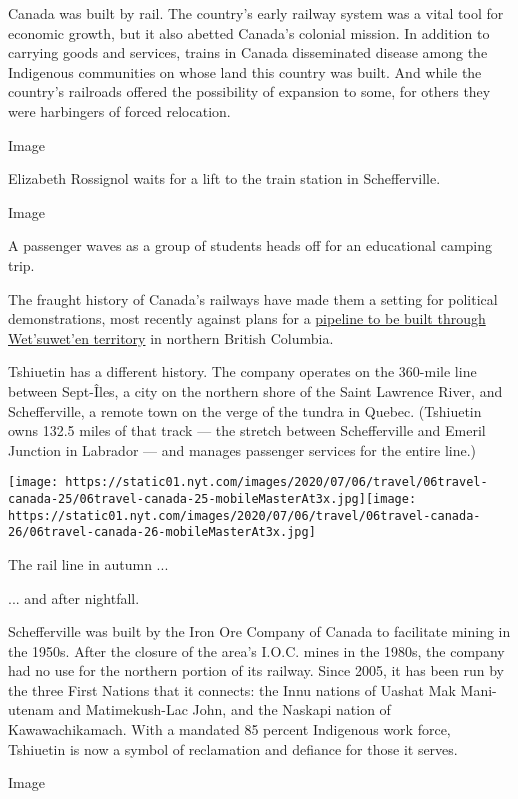 Canada was built by rail. The country's early railway system was a vital
tool for economic growth, but it also abetted Canada's colonial mission.
In addition to carrying goods and services, trains in Canada
disseminated disease among the Indigenous communities on whose land this
country was built. And while the country's railroads offered the
possibility of expansion to some, for others they were harbingers of
forced relocation.

Image

Elizabeth Rossignol waits for a lift to the train station in
Schefferville.

Image

A passenger waves as a group of students heads off for an educational
camping trip.

The fraught history of Canada's railways have made them a setting for
political demonstrations, most recently against plans for a
\href{https://www.nytimes.com/2020/02/18/world/canada/trudeau-rail-blockade.html}{pipeline
to be built through Wet'suwet'en territory} in northern British
Columbia.

Tshiuetin has a different history. The company operates on the 360-mile
line between Sept-Îles, a city on the northern shore of the Saint
Lawrence River, and Schefferville, a remote town on the verge of the
tundra in Quebec. (Tshiuetin owns 132.5 miles of that track --- the
stretch between Schefferville and Emeril Junction in Labrador --- and
manages passenger services for the entire line.)

\texttt{[image: https://static01.nyt.com/images/2020/07/06/travel/06travel-canada-25/06travel-canada-25-mobileMasterAt3x.jpg]}\texttt{[image: https://static01.nyt.com/images/2020/07/06/travel/06travel-canada-26/06travel-canada-26-mobileMasterAt3x.jpg]}

The rail line in autumn ...

... and after nightfall.

Schefferville was built by the Iron Ore Company of Canada to facilitate
mining in the 1950s. After the closure of the area's I.O.C. mines in the
1980s, the company had no use for the northern portion of its railway.
Since 2005, it has been run by the three First Nations that it connects:
the Innu nations of Uashat Mak Mani-utenam and Matimekush-Lac John, and
the Naskapi nation of Kawawachikamach. With a mandated 85 percent
Indigenous work force, Tshiuetin is now a symbol of reclamation and
defiance for those it serves.

Image


